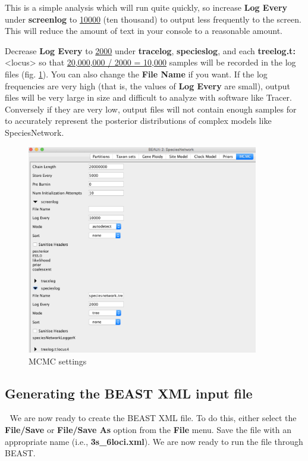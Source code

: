 \documentclass[11pt]{article}
\begin{document}
This is a simple analysis which will run quite quickly, so increase \textbf{Log Every} under \textbf{screenlog} to \underline{10000} (ten thousand) to output less frequently to the screen. This will reduce the amount of text in your console to a reasonable amount.

Decrease \textbf{Log Every} to \underline{2000} under \textbf{tracelog}, \textbf{specieslog}, and each \textbf{treelog.t:}<locus> so that \underline{20,000,000 / 2000 = 10,000} samples will be recorded in the log files (fig. \ref{fig_mcmc}). You can also change the \textbf{File Name} if you want.
If the log frequencies are very high (that is, the values of \textbf{Log Every} are small), output files will be very large in size and difficult to analyze with software like Tracer. Conversely if they are very low, output files will not contain enough samples for to accurately represent the posterior distributions of complex models like SpeciesNetwork.

\begin{figure}[h]
\center
\includegraphics[width=0.9\textwidth]{figs/fig8_mcmc.png}
\caption{MCMC settings}
\label{fig_mcmc}
\end{figure}

\subsection*{Generating the BEAST XML input file}
We are now ready to create the BEAST XML file. To do this, either select the \textbf{File/Save} or \textbf{File/Save As} option from the \textbf{File} menu. Save the file with an appropriate name (i.e., \textbf{3s\_6loci.xml}). We are now ready to run the file through BEAST.
\end{document}
